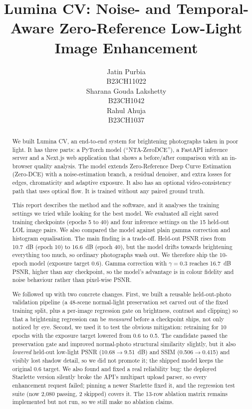 \documentclass{article}
\title{Lumina CV: Noise- and Temporal-Aware Zero-Reference Low-Light Image Enhancement}
\author{%
  Jatin Purbia \\ B23CH11022 \\
  \And
  Sharana Gouda Lakshetty \\ B23CH1042 \\
  \And
  Rahul Ahuja \\ B23CH1037
}
\begin{document}
\maketitle

\begin{abstract}
We built Lumina CV, an end-to-end system for brightening photographs taken in poor light. It has three parts: a PyTorch model (``NTA-ZeroDCE''), a FastAPI inference server and a Next.js web application that shows a before/after comparison with an in-browser quality analysis. The model extends Zero-Reference Deep Curve Estimation (Zero-DCE) with a noise-estimation branch, a residual denoiser, and extra losses for edges, chromaticity and adaptive exposure. It also has an optional video-consistency path that uses optical flow. It is trained without any paired ground truth.

This report describes the method and the software, and it analyses the training settings we tried while looking for the best model. We evaluated all eight saved training checkpoints (epochs 5 to 40) and four inference settings on the 15 held-out LOL image pairs. We also compared the model against plain gamma correction and histogram equalisation. The main finding is a trade-off. Held-out PSNR rises from 10.7~dB (epoch 10) to 16.6~dB (epoch 40), but the model drifts towards brightening everything too much, so ordinary photographs wash out. We therefore ship the 10-epoch model (exposure target 0.6). Gamma correction with $\gamma=0.3$ reaches 16.7~dB PSNR, higher than any checkpoint, so the model's advantage is in colour fidelity and noise behaviour rather than pixel-wise PSNR.

We followed up with two concrete changes. First, we built a reusable held-out-photo validation pipeline (a 48-scene normal-light preservation set carved out of the fixed training split, plus a per-image regression gate on brightness, contrast and clipping) so that a brightening regression can be \emph{measured} before a checkpoint ships, not only noticed by eye. Second, we used it to test the obvious mitigation: retraining for 10 epochs with the exposure target lowered from 0.6 to 0.5. The candidate passed the preservation gate and improved normal-photo structural similarity slightly, but it also \emph{lowered} held-out low-light PSNR (10.68$\to$9.51~dB) and SSIM (0.506$\to$0.415) and visibly lost shadow detail, so we did not promote it; the shipped model keeps the original 0.6 target. We also found and fixed a real reliability bug: the deployed Starlette version silently broke the API's multipart upload parser, so every enhancement request failed; pinning a newer Starlette fixed it, and the regression test suite (now 2{,}080 passing, 2 skipped) covers it. The 13-row ablation matrix remains implemented but not run, so we still make no ablation claims.
\end{abstract}
\end{document}
